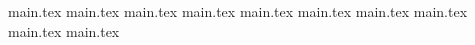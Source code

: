 \documentclass[11pt,a4paper,oneside]{article}
\begin{document}
    \pagebreak

    {main.tex} \pagebreak
    {main.tex} \pagebreak
    {main.tex} \pagebreak
    {main.tex} \pagebreak
    {main.tex} \pagebreak
    {main.tex} \pagebreak
    {main.tex} \pagebreak
    {main.tex} \pagebreak
    {main.tex} \pagebreak
    {main.tex} \pagebreak
    
\end{document}
